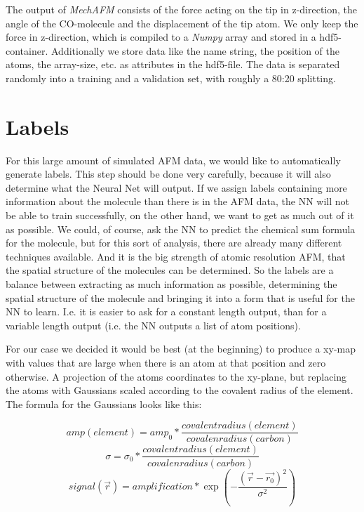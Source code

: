 \documentclass{article}
\begin{document}
The output of \emph{MechAFM} consists of the force acting on the tip in z-direction, the angle of the CO-molecule and the displacement of the tip atom. We only keep the force in z-direction, which is compiled to a \emph{Numpy} array and stored in a hdf5-container. Additionally we store data like the name string, the position of the atoms, the array-size, etc. as attributes in the hdf5-file. The data is separated randomly into a training and a validation set, with roughly a 80:20 splitting.


\newpage

\section{Labels}
For this large amount of simulated AFM data, we would like to automatically generate labels. This step should be done very carefully, because it will also determine what the Neural Net will output. If we assign labels containing more information about the molecule than there is in the AFM data, the NN will not be able to train successfully, on the other hand, we want to get as much out of it as possible. We could, of course, ask the NN to predict the chemical sum formula for the molecule, but for this sort of analysis, there are already many different techniques available. And it is the big strength of atomic resolution AFM, that the spatial structure of the molecules can be determined. So the labels are a balance between extracting as much information as possible, determining the spatial structure of the molecule and bringing it into a form that is useful for the NN to learn. I.e. it is easier to ask for a constant length output, than for a variable length output (i.e. the NN outputs a list of atom positions).

For our case we decided it would be best (at the beginning) to produce a xy-map with values that are large when there is an atom at that position and zero otherwise. A projection of the atoms coordinates to the xy-plane, but replacing the atoms with Gaussians scaled according to the covalent radius of the element. The formula for the Gaussians looks like this:

\begin{equation}
amp(element) = amp_0 * \frac{covalent radius(element)}{covalen radius(carbon)}
\end{equation}
\begin{equation}
\sigma = \sigma_0 * \frac{covalent radius(element)}{covalen radius(carbon)}
\end{equation}
\begin{equation}
signal(\vec{r}) = amplification*\exp(-\frac{(\vec{r}-\vec{r_0})^2}{\sigma^2})
\end{equation}
\end{document}
